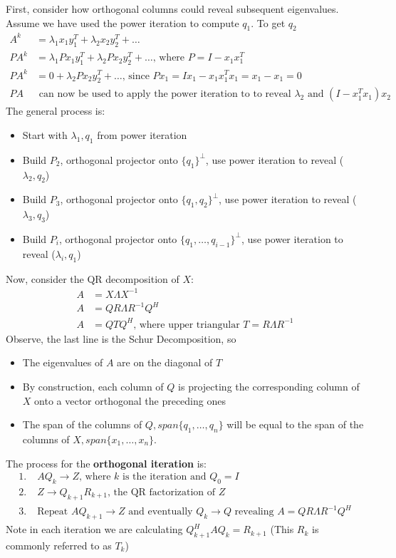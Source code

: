 \documentclass{article}
\begin{document}
First, consider how orthogonal columns could reveal subsequent eigenvalues. Assume we have used the power iteration to compute $q_1$. To get $q_2$
\begin{align*}
    A^k &= \lambda_1x_1y_1^T + \lambda_2x_2y_2^T + \dots\\
    PA^k &= \lambda_1Px_1y_1^T + \lambda_2Px_2y_2^T + \dots \textrm{, where } P = I - x_1x_1^T\\
    PA^k &= 0 + \lambda_2Px_2y_2^T + \dots \textrm{, since } Px_1 = Ix_1 - x_1x_1^Tx_1 = x_1 - x_1 = 0\\
    PA &\textrm{ can now be used to apply the power iteration to to reveal $\lambda_2$ and } (I - x_1^Tx_1)x_2
\end{align*}
The general process is:
\begin{itemize}
    \item Start with $\lambda_1, q_1$ from power iteration
    \item Build $P_2$, orthogonal projector onto $\{q_1\}^\perp$, use power iteration to reveal ($\lambda_2, q_2$)
    \item Build $P_3$, orthogonal projector onto  $\{q_1, q_2\}^\perp$, use power iteration to reveal ($\lambda_3, q_3$)
    \item Build $P_i$, orthogonal projector onto  $\{q_1, \dots, q_{i-1}\}^\perp$, use power iteration to reveal ($\lambda_i, q_1$)
\end{itemize}
Now, consider the QR decomposition of $X$:
\begin{align*}
    A &= X\Lambda X^{-1}\\
    A &= QR \Lambda R^{-1} Q^H\\
    A &= QTQ^H \textrm{, where upper triangular } T = R\Lambda R^{-1}
\end{align*}
Observe, the last line is the Schur Decomposition, so
\begin{itemize}
    \item The eigenvalues of $A$ are on the diagonal of $T$
    \item By construction, each column of $Q$ is projecting the corresponding column of $X$ onto a vector orthogonal the preceding ones
    \item The span of the columns of $Q, span\{q_1, \dots, q_n\}$ will be equal to the span of the columns of $X, span\{x_1, \dots, x_n\}$.
\end{itemize}
The process for the \textbf{orthogonal iteration} is:
\begin{align*}
    1. \;& AQ_k \rightarrow Z \textrm{, where $k$ is the iteration and } Q_0 = I\\
    2. \;& Z \rightarrow Q_{k+1}R_{k+1} \textrm{, the QR factorization of $Z$}\\
    3. \;& \textrm{Repeat } AQ_{k+1} \rightarrow Z \textrm{ and eventually } Q_k \rightarrow Q \textrm{ revealing } A = QR\Lambda R^{-1}Q^H
\end{align*}
Note in each iteration we are calculating $Q_{k+1}^HAQ_k = R_{k+1}$ (This $R_{k}$ is commonly referred to as $T_k$) 
\end{document}
